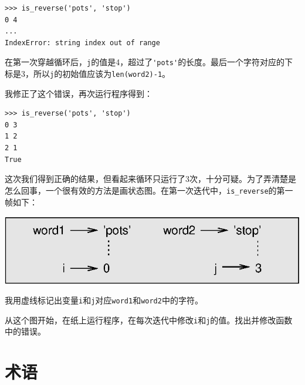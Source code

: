 \beforeverb
\begin{verbatim}
>>> is_reverse('pots', 'stop')
0 4
...
IndexError: string index out of range
\end{verbatim}
\afterverb
%
在第一次穿越循环后，{\tt j}的值是4，超过了\verb"'pots'"的长度。最后一个字符对应的下标是3，所以{\tt j}的初始值应该为{\tt len(word2)-1}。


我修正了这个错误，再次运行程序得到：

\beforeverb
\begin{verbatim}
>>> is_reverse('pots', 'stop')
0 3
1 2
2 1
True
\end{verbatim}
\afterverb
%
这次我们得到正确的结果，但看起来循环只运行了3次，十分可疑。为了弄清楚是怎么回事，一个很有效的方法是画状态图。在第一次迭代中，\verb"is_reverse"的第一帧如下：


\beforefig
\centerline{\includegraphics{figs/state4.eps}}
\afterfig

我用虚线标记出变量{\tt i}和{\tt j}对应{\tt word1}和{\tt word2}中的字符。

\begin{ex}
\label{is_reverse}
从这个图开始，在纸上运行程序，在每次迭代中修改{\tt i}和{\tt j}的值。找出并修改函数中的错误。
\end{ex}



\section{术语}


